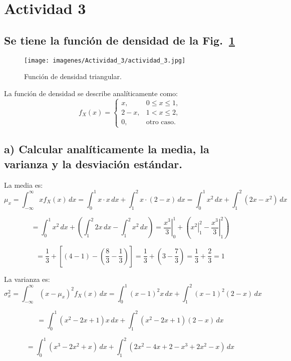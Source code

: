 \section{Actividad 3}

\subsection*{Se tiene la función de densidad de la Fig.~\ref{fig:diagrama_3}}

\begin{figure}[H]
    \centering
    \texttt{[image: imagenes/Actividad\_3/actividad\_3.jpg]}
    \caption{Función de densidad triangular.}
    \label{fig:diagrama_3}
\end{figure}

La función de densidad se describe analíticamente como:
\[
f_X(x)=
\begin{cases}
x, & 0 \leq x \leq 1, \\[6pt]
2-x, & 1 < x \leq 2, \\[6pt]
0, & \text{otro caso}.
\end{cases}
\]

\subsection*{a) Calcular analíticamente la media, la varianza y la desviación estándar.}

	La media es:
	\[
		\mu_x = \int_{-\infty}^{\infty} x f_X(x)\, dx
		= \int_{0}^{1} x \cdot x \, dx + \int_{1}^{2} x \cdot (2-x) \, dx
		= \int_{0}^{1} x^2 \, dx + \int_{1}^{2} (2x - x^2)\, dx
	\]
	
	\[
		= \int_{0}^{1} x^2 \, dx + \left( \int_{1}^{2} 2x \, dx - \int_{1}^{2} x^2 \, dx \right)
		= \left. \frac{x^3}{3} \right|_{0}^{1} + \left( \left. x^2 \right|_{1}^{2} - \left. \frac{x^3}{3} \right|_{1}^{2} \right)
	\]
	
	\[
		= \frac{1}{3} + \left[ (4-1) - \left( \frac{8}{3} - \frac{1}{3} \right) \right]
		= \frac{1}{3} + \left( 3 - \frac{7}{3} \right)
		= \frac{1}{3} + \frac{2}{3} = 1
	\]
	
	La varianza es: 
	\[
		\sigma_x^2 = \int_{-\infty}^{\infty} (x - \mu_x)^2 f_X(x)\, dx
		= \int_{0}^{1} (x-1)^2 x \, dx + \int_{1}^{2} (x-1)^2 (2-x)\, dx
	\]
	
	\[
		= \int_{0}^{1} (x^2 - 2x + 1)x \, dx + \int_{1}^{2} (x^2 - 2x + 1)(2-x)\, dx
	\]
	
	\[
		= \int_{0}^{1} (x^3 - 2x^2 + x) \, dx + \int_{1}^{2} (2x^2 - 4x + 2 - x^3 + 2x^2 - x)\, dx
	\]
	
